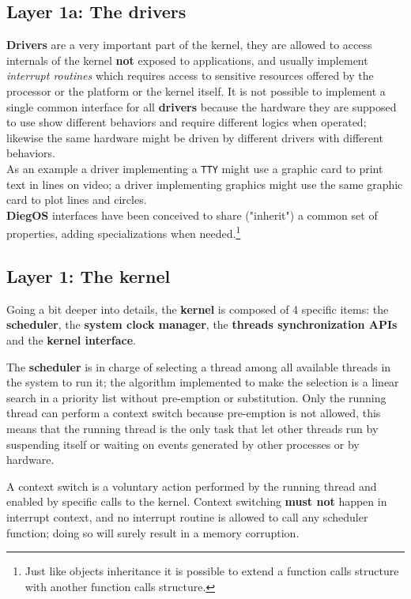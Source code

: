 \documentclass[11pt,b5paper]{scrbook}
\newcommand{\myOS}{{\color{SteelBlue}\textbf{DiegOS}}}
\begin{document}
\subsection{Layer 1a: The drivers}
\textbf{Drivers} are a very important part of the kernel, they are allowed to access
internals of the kernel \textbf{not} exposed to applications, and usually
implement \textit{interrupt routines} which requires access to sensitive
resources offered by the processor or the platform or the kernel itself.
It is not possible to implement a single common interface for all \textbf{drivers}
because the hardware they are supposed to use show different behaviors and require
different logics when operated; likewise the same hardware might be driven by
different drivers with different behaviors.\\
As an example a driver implementing a \texttt{TTY} might use a graphic card to print
text in lines on video; a driver implementing graphics might use the same graphic card to plot
lines and circles.\\
{\myOS} interfaces have been conceived to share ("inherit") a common
set of properties, adding specializations when needed.\footnote{Just like objects inheritance
it is possible to extend a function calls structure with another function calls structure.}

\subsection{Layer 1: The kernel}
Going a bit deeper into details, the \textbf{kernel} is composed of 4 specific
items: the \textbf{scheduler}, the \textbf{system clock manager}, the
\textbf{threads synchronization APIs} and the \textbf{kernel interface}.

The \textbf{scheduler}
is in charge of selecting a thread among all
available threads in the system to run it; the algorithm implemented to make the selection
is a linear search in a priority list without pre-emption or substitution.
Only the running thread can perform a context switch because pre-emption is not allowed, this means
that the running thread is the only task that let other threads run by suspending itself
or waiting on events generated by other processes or by hardware.

A context switch is a voluntary action performed by the running thread and enabled by specific calls to the kernel.
Context switching \textbf{must not} happen in interrupt context, and no interrupt
routine is allowed to call any scheduler function; doing so will surely result in
a memory corruption.
\end{document}
